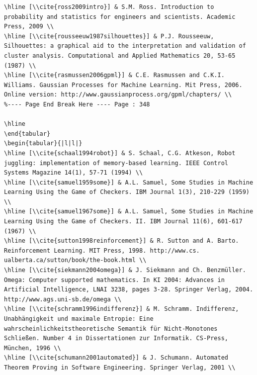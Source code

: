 \documentclass[10pt]{book}
\begin{document}
\begin{verbatim}
\hline [\\cite{ross2009intro}] & S.M. Ross. Introduction to probability and statistics for engineers and scientists. Academic Press, 2009 \\
\hline [\\cite{rousseeuw1987silhouettes}] & P.J. Rousseeuw, Silhouettes: a graphical aid to the interpretation and validation of cluster analysis. Computational and Applied Mathematics 20, 53-65 (1987) \\
\hline [\\cite{rasmussen2006gpml}] & C.E. Rasmussen and C.K.I. Williams. Gaussian Processes for Machine Learning. Mit Press, 2006. Online version: http://www.gaussianprocess.org/gpml/chapters/ \\
%---- Page End Break Here ---- Page : 348

\hline
\end{tabular}
\begin{tabular}{|l|l|}
\hline [\\cite{schaal1994robot}] & S. Schaal, C.G. Atkeson, Robot juggling: implementation of memory-based learning. IEEE Control Systems Magazine 14(1), 57-71 (1994) \\
\hline [\\cite{samuel1959some}] & A.L. Samuel, Some Studies in Machine Learning Using the Game of Checkers. IBM Journal 1(3), 210-229 (1959) \\
\hline [\\cite{samuel1967some}] & A.L. Samuel, Some Studies in Machine Learning Using the Game of Checkers. II. IBM Journal 11(6), 601-617 (1967) \\
\hline [\\cite{sutton1998reinforcement}] & R. Sutton and A. Barto. Reinforcement Learning. MIT Press, 1998. http://www.cs. ualberta.ca/sutton/book/the-book.html \\
\hline [\\cite{siekmann2004omega}] & J. Siekmann and Ch. Benzmüller. Omega: Computer supported mathematics. In KI 2004: Advances in Artificial Intelligence, LNAI 3238, pages 3-28. Springer Verlag, 2004. http://www.ags.uni-sb.de/omega \\
\hline [\\cite{schramm1996indifferenz}] & M. Schramm. Indifferenz, Unabhängigkeit und maximale Entropie: Eine wahrscheinlichkeitstheoretische Semantik für Nicht-Monotones Schließen. Number 4 in Dissertationen zur Informatik. CS-Press, München, 1996 \\
\hline [\\cite{schumann2001automated}] & J. Schumann. Automated Theorem Proving in Software Engineering. Springer Verlag, 2001 \\

\end{verbatim}
\end{document}
